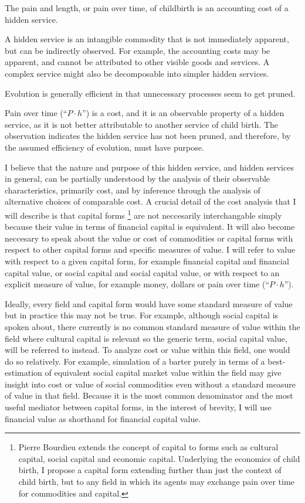 \documentclass[11pt]{book}
\begin{document}
The pain and length, or pain over time, of childbirth is an accounting cost of a hidden service.

A hidden service is an intangible commodity that is not immediately apparent, but can be indirectly observed. For example, the accounting costs may be apparent, and cannot be attributed to other visible goods and services. A complex service might also be decomposable into simpler hidden services.

Evolution is generally efficient in that unnecessary processes seem to get pruned.

Pain over time (``$P{\cdot}h$'') is a cost, and it is an observable property of a hidden service, as it is not better attributable to another service of child birth. The observation indicates the hidden service has not been pruned, and therefore, by the assumed efficiency of evolution, must have purpose.

I believe that the nature and purpose of this hidden service, and hidden services in general, can be partially understood by the analysis of their observable characteristics, primarily cost, and by inference through the analysis of alternative choices of comparable cost. A crucial detail of the cost analysis that I will describe is that capital forms%
\footnote{Pierre Bourdieu extends the concept of capital to forms such as cultural capital, social capital and economic capital. Underlying the economics of child birth, I propose a capital form extending further than just the context of child birth, but to any field in which its agents may exchange pain over time  for commodities and capital.}
are not neccesarily interchangable simply because their value in terms of financial capital is equivalent. It will also become neccesary to speak about the value or cost of commodities or capital forms with respect to other capital forms and specific measures of value. I will refer to value with respect to a given capital form, for example financial capital and financial capital value, or social capital and social capital value, or with respect to an explicit measure of value, for example money, dollars or pain over time (``$P{\cdot}h$'').

Ideally, every field and capital form would have some standard measure of value but in practice this may not be true. For example, although social capital is spoken about, there currently is no common standard measure of value within the field where cultural capital is relevant so the generic term, social capital value, will be referred to instead. To analyze cost or value within this field, one would do so relatively. For example, simulation of a barter purely in terms of a best-estimation of equivalent social capital market value within the field may give insight into cost or value of social commodities even without a standard measure of value in that field. Because it is the most common denominator and the most useful mediator between capital forms, in the interest of brevity, I will use financial value as shorthand for financial capital value.
\end{document}

